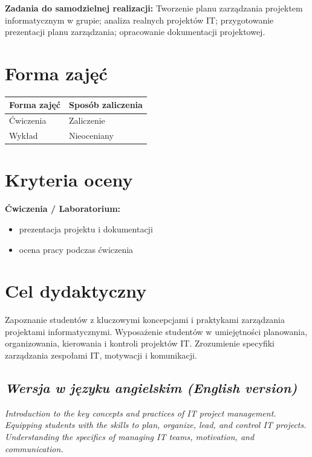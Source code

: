 \documentclass[12pt, a4paper]{article}
\newcommand{\thdrule}{\noalign{\global\setlength{\extrarowheight}{0pt}}}
\newcommand{\thdend}{\noalign{\global\setlength{\extrarowheight}{3pt}}}
\begin{document}
\vspace{4pt}
\noindent\textbf{Zadania do samodzielnej realizacji:} Tworzenie planu zarządzania projektem informatycznym w grupie; analiza realnych projektów IT; przygotowanie prezentacji planu zarządzania; opracowanie dokumentacji projektowej.

\section{Forma zajęć}

\begin{center}
{\scriptsize
\begin{tabular}{m{5cm}m{8cm}}
\thdrule\toprule
\rowcolor{pjatkRed} {\color{white}\textbf{Forma zajęć}} & {\color{white}\textbf{Sposób zaliczenia}} \\
\midrule\thdend
  \rowcolor{tableRowLight} Ćwiczenia & Zaliczenie \\
  \rowcolor{tableRowAlt} Wykład & Nieoceniany \\
\bottomrule
\end{tabular}}
\end{center}

\section{Kryteria oceny}

\textbf{Ćwiczenia / Laboratorium:}
\begin{itemize}
  \item prezentacja projektu i dokumentacji
  \item ocena pracy podczas ćwiczenia
\end{itemize}


\section{Cel dydaktyczny}

Zapoznanie studentów z kluczowymi koncepcjami i praktykami zarządzania projektami informatycznymi. Wyposażenie studentów w umiejętności planowania, organizowania, kierowania i kontroli projektów IT. Zrozumienie specyfiki zarządzania zespołami IT, motywacji i komunikacji.

\subsection*{\textit{Wersja w języku angielskim (English version)}}

\textit{Introduction to the key concepts and practices of IT project management. Equipping students with the skills to plan, organize, lead, and control IT projects. Understanding the specifics of managing IT teams, motivation, and communication.}
\end{document}
